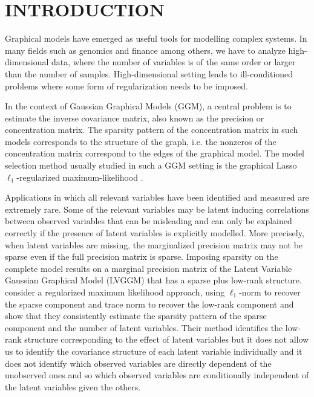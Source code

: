 \section{INTRODUCTION}
\label{intro}


Graphical models have emerged as useful tools for modelling complex systems. In many fields such as genomics and finance among others, we have to analyze high-dimensional data, where the number of variables is of the same order or larger than the number of samples.  High-dimensional setting leads to ill-conditioned problems where some form of regularization needs to be imposed.

In the context of Gaussian Graphical Models (GGM), a central problem is to estimate the inverse covariance matrix, also known as the precision or concentration matrix. The sparsity pattern of the concentration matrix in such models corresponds to the structure of the graph, i.e. the nonzeros of the concentration matrix correspond to the edges of the graphical model. The model selection method usually studied in such a GGM setting is the graphical Lasso $\ell_1$-regularized maximum-likelihood \citep{friedman2008sparse,yuan2007model,banerjee2008model}.

Applications in which all relevant variables have been identified and measured are extremely rare. Some of the relevant variables may be latent inducing correlations between observed variables that can be misleading and can only be explained correctly if the presence of latent variables is explicitly modelled. More precisely, when latent variables are missing, the marginalized precision matrix may not be sparse even if the full precision matrix is sparse. Imposing sparsity on the complete model results on a marginal precision matrix of the Latent Variable Gaussian Graphical Model (LVGGM) that has a sparse plus low-rank structure. \citet{chandrasekaran2010} consider a regularized maximum likelihood approach, using $\ell_1$-norm to recover the sparse component and trace norm to recover the low-rank component and show that they consistently estimate the sparsity pattern of the sparse component and the number of latent variables. Their method identifies the low-rank structure corresponding to the effect of latent variables but it does not allow us to identify the covariance structure of each latent variable individually and it does not identify which observed variables are directly dependent of the unobserved ones and so which observed variables are conditionally independent of the latent variables given the others.


